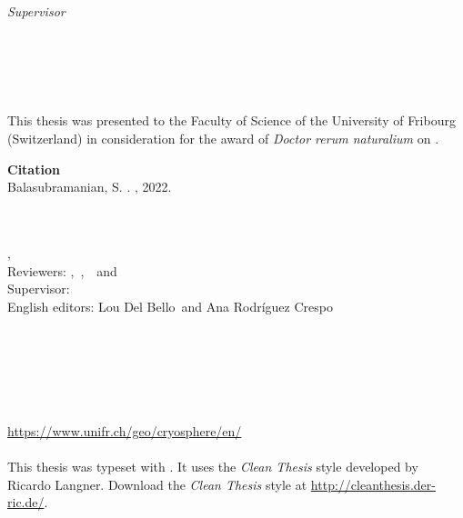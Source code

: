\begin{titlepage}
	\begin{minipage}[t]{.27\textwidth}
		\raggedleft
		\textit{Supervisor}
	\end{minipage}
	\hspace*{15pt}
	\begin{minipage}[t]{.65\textwidth}
		{\Large \thesisFirstSupervisor} \\
	\end{minipage} \\[10mm]

	\thesisDate \\

\end{titlepage}



This thesis was presented to the Faculty of Science of the University of Fribourg (Switzerland) in consideration
for the award of \textit{Doctor rerum naturalium} on \thesisDate.

\vfill
{\large \textbf{Citation} \\}
Balasubramanian, S. \thesisTitle . \thesisUniversityGroup, 2022.

\hfill
\vfill
{
	\small
	\textbf{\thesisName} \\
	\textit{\thesisTitle} \\
	\thesisSubject, \thesisDate \\
	Reviewers: \thesisFirstReviewer,\ \thesisSecondReviewer,\ \thesisThirdReviewer\ and \thesisFourthReviewer \\
	Supervisor: \thesisFirstSupervisor \\
	English editors: Lou Del Bello\ and Ana Rodríguez Crespo\\[1.5em]
	\textbf{\thesisUniversity} \\
	\textit{\thesisUniversityGroup} \\
	\thesisUniversityDepartment \\
	\thesisUniversityStreetAddress \\
	\thesisUniversityCity \\
	\thesisUniversityPostalCode \\
  \url{https://www.unifr.ch/geo/cryosphere/en/}\\
\\
  This thesis was typeset with \LaTeXe.
  It uses the \textit{Clean Thesis} style developed by Ricardo Langner.
  Download the \textit{Clean Thesis} style at \url{http://cleanthesis.der-ric.de/}.
}

